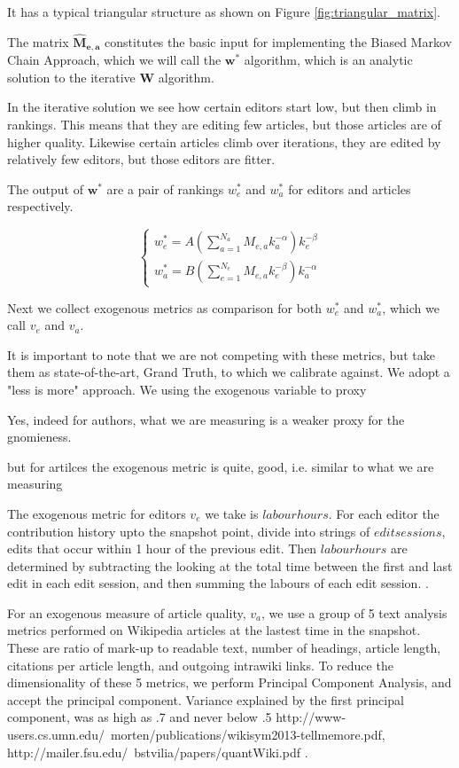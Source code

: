 \documentclass{acm_proc_article-sp}
\begin{document}
It has a typical triangular structure as shown on Figure \ref{fig:triangular_matrix}.

The matrix $\mathbf{\hat{M}_{e,a}}$ constitutes the basic input for implementing the Biased Markov Chain Approach, which we will call the $\mathbf{w^*}$ algorithm, which is an analytic solution to the iterative $\mathbf{W}$ algorithm. \cite{Caldarelli} 

In the iterative solution we see how certain editors start low, but then climb in rankings. This means that they are editing few articles, but those articles are of higher quality. Likewise certain articles climb over iterations, they are edited by relatively few editors, but those editors are fitter.

The output of $\mathbf{w^*}$ are a pair of rankings $ w^*_e$ and $ w^*_a$ for editors and articles respectively.

\begin{equation}
\begin{cases}
w^*_e = A(\sum^{N_a}_{a=1} M_{e,a}k_a^{-\alpha})k_e^{-\beta} \\
w^*_a = B(\sum^{N_e}_{e=1} M_{e,a}k_e^{-\beta})k_a^{-\alpha}
\end{cases}
\end{equation}

Next we collect exogenous metrics as comparison for both  $w^{*}_{e}$ and $w^{*}_{a}$, which we call  $v_e$ and $v_a$.

It is important to note that we are not competing with these metrics, but take them as state-of-the-art, Grand Truth, to which we calibrate against. We adopt a "less is more" approach. We using the exogenous variable to proxy 

Yes, indeed for authors, what we are measuring is a weaker proxy for the gnomieness.

but for artilces the exogenous metric is quite, good, i.e. similar to what we are measuring


The exogenous metric for editors $v_e$ we take is $labour hours$. For each editor the contribution history upto the snapshot point,  divide into strings of $edit sessions$, edits that occur within 1 hour of the previous edit. Then $labour hours$ are determined by subtracting the looking at the total time between the first and last edit in each edit session, and then summing the labours of each edit session. \cite{Geiger, Halfaker}. 

For an exogenous measure of article quality, $ v_a$,  we use a group of 5 text analysis metrics performed on Wikipedia articles at the lastest time in the snapshot. These are ratio of mark-up to readable text, number of headings, article length, citations per article length, and outgoing intrawiki links. To reduce the dimensionality of these 5 metrics, we perform Principal Component Analysis, and accept the principal component. Variance explained by the first principal component, was as high as .7 and never below .5 http://www-users.cs.umn.edu/~morten/publications/wikisym2013-tellmemore.pdf, http://mailer.fsu.edu/~bstvilia/papers/quantWiki.pdf \cite{ Morten}.
\end{document}
